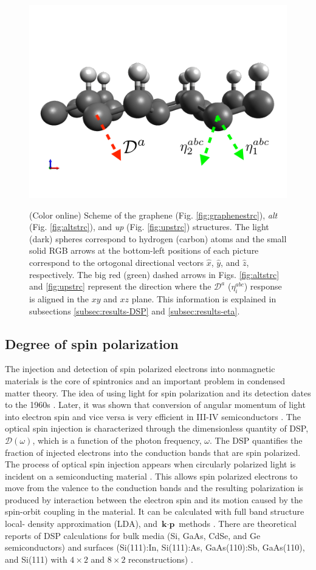 \documentclass[pss]{wiley2sp} %
\begin{document}
\begin{figure}[t]
{ \includegraphics[width=0.49\linewidth]{strc/up-vec2}\label{fig:upstrc}}
\caption{(Color online) Scheme of the graphene (Fig. \ref{fig:graphenestrc}), \emph{alt} (Fig. \ref{fig:altstrc}), and \emph{up} (Fig. \ref{fig:upstrc}) structures. The light (dark) spheres correspond to hydrogen (carbon) atoms and the small solid RGB arrows at the bottom-left positions of each picture correspond to the ortogonal directional vectors $\hat{x}$, $\hat{y}$, and $\hat{z}$, respectively. The big red (green) dashed arrows in Figs. \ref{fig:altstrc} and \ref{fig:upstrc} represent the direction where the $\mathcal{D}^{a}$ ($\eta^{abc}_{i}$) response is aligned in the $xy$ and $xz$ plane. This information is explained in subsections \ref{subsec:results-DSP} and \ref{subsec:results-eta}.\label{fig:structures}}
\end{figure}

\subsection{Degree of spin polarization}

The injection and detection of spin polarized electrons into nonmagnetic materials is the core of spintronics \cite{vzuticRMP04,fertRMP08} and an important  problem in condensed matter theory.
The idea of using light for spin polarization and its detection dates to the 1960s \cite{LampelPRL68}. Later, it was shown that conversion of angular momentum of light into electron spin and vice versa is very efficient in III-IV semiconductors \cite{dyakonovOO84}. The optical spin injection is characterized through the dimensionless quantity of DSP, $\mathcal{D}(\omega)$, which is a function of the photon frequency, $\omega$. The DSP quantifies the fraction of injected electrons into the conduction bands that are spin polarized.
The process of optical spin injection appears when circularly polarized light is incident on a semiconducting material \cite{dyakonovOO84}. This allows spin polarized electrons to move from the valence to the conduction bands and the resulting polarization is produced by interaction between the electron spin and its motion caused by the spin-orbit coupling in the material. It can be calculated with full band structure local- density approximation (LDA), and $\textbf{k}\cdot\textbf{p}$ methods \cite{nastosPRB07,cabellosPRB09}. There are theoretical reports of DSP calculations for bulk media (Si, GaAs, CdSe, and Ge semiconductors) \cite{nastosPRB07,cabellosPRB09} and surfaces (Si(111):In, Si(111):As, GaAs(110):Sb, GaAs(110), and Si(111) with $4\times2$ and $8\times2$ reconstructions) \cite{mendozaPRB12,arzatePRB14}. 
\end{document}
